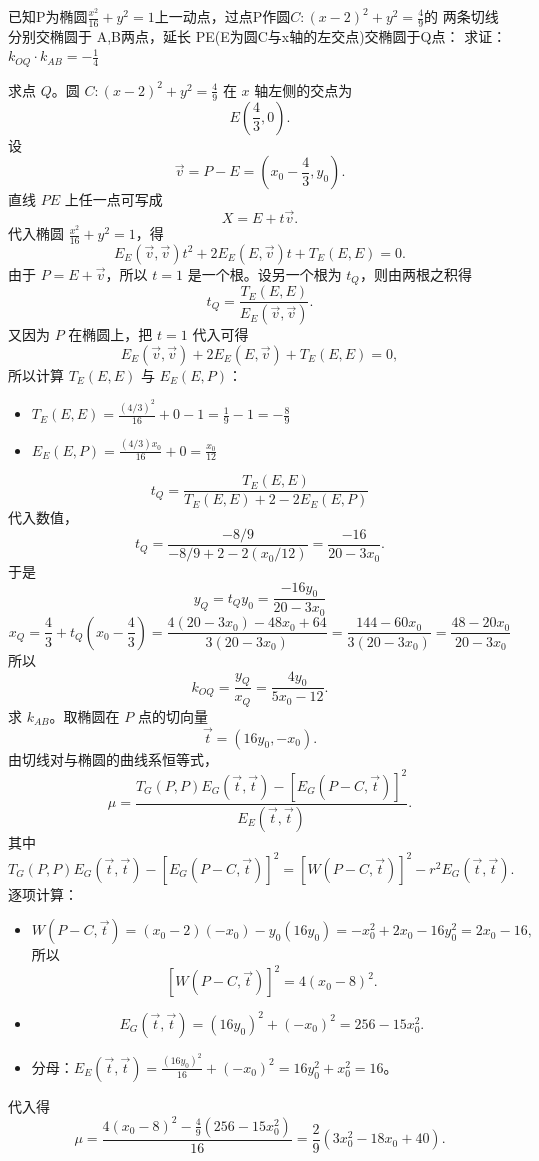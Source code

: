 \begin{exercise}
已知P为椭圆$\frac{x^2}{16}+y^2=1$上一动点，过点P作圆$C:(x-2)^2+y^2=\frac{4}{9}$的
两条切线分别交椭圆于 A,B两点，延长 PE(E为圆C与x轴的左交点)交椭圆于Q点：
求证：$k_{OQ}\cdot k_{AB}=-\frac{1}{4}$
\end{exercise}
\begin{solution}
求点 $Q$。圆 $C:(x-2)^2+y^2=\frac49$ 在 $x$ 轴左侧的交点为
$$E\left(\frac43,0\right).$$
设
$$\vec{v} = P - E = \left(x_0 - \frac43, y_0\right).$$
直线 $PE$ 上任一点可写成
$$X = E + t\vec{v}.$$
代入椭圆 $\frac{x^2}{16}+y^2=1$，得
$$E_E(\vec{v},\vec{v})t^2 + 2E_E(E,\vec{v})t + T_E(E,E) = 0.$$
由于 $P=E+\vec{v}$，所以 $t=1$ 是一个根。设另一个根为 $t_Q$，则由两根之积得
$$t_Q = \frac{T_E(E,E)}{E_E(\vec{v},\vec{v})}.$$
又因为 $P$ 在椭圆上，把 $t=1$ 代入可得
$$E_E(\vec{v},\vec{v}) + 2E_E(E,\vec{v}) + T_E(E,E) = 0,$$
所以计算 $T_E(E,E)$ 与 $E_E(E,P)$：
\begin{itemize}
\item $T_E(E,E) = \frac{(4/3)^2}{16} + 0 - 1 = \frac{1}{9} - 1 = -\frac{8}{9}$
\item $E_E(E,P) = \frac{(4/3)x_0}{16} + 0 = \frac{x_0}{12}$
\end{itemize}
$$t_Q = \frac{T_E(E,E)}{T_E(E,E) + 2 - 2E_E(E,P)}$$
代入数值，
$$t_Q = \frac{-8/9}{-8/9 + 2 - 2(x_0/12)} = \frac{-16}{20 - 3x_0}.$$
于是
$$y_Q = t_Q y_0 = \frac{-16y_0}{20 - 3x_0}$$
$$x_Q = \frac{4}{3} + t_Q\left(x_0 - \frac{4}{3}\right) = \frac{4(20-3x_0) - 48x_0 + 64}{3(20-3x_0)} = \frac{144 - 60x_0}{3(20-3x_0)} = \frac{48 - 20x_0}{20 - 3x_0}$$
所以
$$k_{OQ} = \frac{y_Q}{x_Q} = \frac{4y_0}{5x_0 - 12}.$$
求 $k_{AB}$。取椭圆在 $P$ 点的切向量
$$\vec{t} = (16y_0, -x_0).$$
由切线对与椭圆的曲线系恒等式，
$$\mu = \frac{T_G(P,P) E_G(\vec{t},\vec{t}) - [E_G(P-C,\vec{t})]^2}{E_E(\vec{t},\vec{t})}.$$
其中
$$T_G(P,P) E_G(\vec{t},\vec{t}) - [E_G(P-C,\vec{t})]^2 = [W(P-C, \vec{t})]^2 - r^2 E_G(\vec{t},\vec{t}).$$
逐项计算：
\begin{itemize}
\item $$W(P-C, \vec{t}) = (x_0-2)(-x_0) - y_0(16y_0) = -x_0^2 + 2x_0 - 16y_0^2 = 2x_0 - 16,$$
所以
$$[W(P-C, \vec{t})]^2 = 4(x_0 - 8)^2.$$
\item $$E_G(\vec{t},\vec{t}) = (16y_0)^2 + (-x_0)^2 = 256 - 15x_0^2.$$
\item 分母：$E_E(\vec{t},\vec{t}) = \frac{(16y_0)^2}{16} + (-x_0)^2 = 16y_0^2 + x_0^2 = 16$。
\end{itemize}
代入得
$$\mu = \frac{4(x_0 - 8)^2 - \frac{4}{9}(256 - 15x_0^2)}{16} = \frac{2}{9}(3x_0^2 - 18x_0 + 40).$$

\end{solution}
